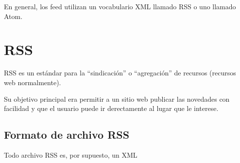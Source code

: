 \documentclass[letterpaper,10pt,spanish]{sphinxmanual}
\begin{document}
En general, los feed utilizan un vocabulario XML llamado RSS o uno llamado Atom.


\section{RSS}
\label{tema7:rss}
RSS es un estándar para la ``sindicación'' o ``agregación'' de recursos (recursos web normalmente).

Su objetivo principal era permitir a un sitio web publicar las novedades con facilidad y que el usuario puede ir derectamente al lugar que le interese.


\subsection{Formato de archivo RSS}
\label{tema7:formato-de-archivo-rss}
Todo archivo RSS es, por supuesto, un XML
\end{document}
